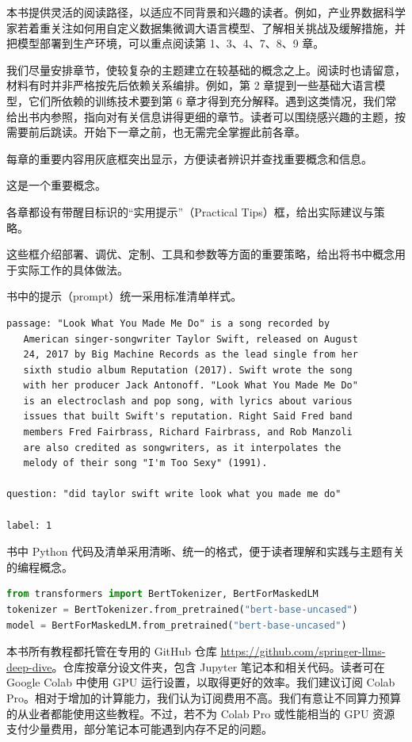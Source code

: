 本书提供灵活的阅读路径，以适应不同背景和兴趣的读者。例如，产业界数据科学家若着重关注如何用自定义数据集微调大语言模型、了解相关挑战及缓解措施，并把模型部署到生产环境，可以重点阅读第 1、3、4、7、8、9 章。

我们尽量安排章节，使较复杂的主题建立在较基础的概念之上。阅读时也请留意，材料有时并非严格按先后依赖关系编排。例如，第 2 章提到一些基础大语言模型，它们所依赖的训练技术要到第 6 章才得到充分解释。遇到这类情况，我们常给出书内参照，指向对有关信息讲得更细的章节。读者可以围绕感兴趣的主题，按需要前后跳读。开始下一章之前，也无需完全掌握此前各章。

每章的重要内容用灰底框突出显示，方便读者辨识并查找重要概念和信息。
\begin{keypoint}
这是一个重要概念。
\end{keypoint}

各章都设有带醒目标识的“实用提示”（Practical Tips）框，给出实际建议与策略。
\begin{practicaltip}
这些框介绍部署、调优、定制、工具和参数等方面的重要策略，给出将书中概念用于实际工作的具体做法。
\end{practicaltip}

书中的提示（prompt）统一采用标准清单样式。
\begin{lstlisting}[caption={GLUE 的 BoolQ 示例}]
passage: "Look What You Made Me Do" is a song recorded by
   American singer-songwriter Taylor Swift, released on August
   24, 2017 by Big Machine Records as the lead single from her
   sixth studio album Reputation (2017). Swift wrote the song
   with her producer Jack Antonoff. "Look What You Made Me Do"
   is an electroclash and pop song, with lyrics about various
   issues that built Swift's reputation. Right Said Fred band
   members Fred Fairbrass, Richard Fairbrass, and Rob Manzoli
   are also credited as songwriters, as it interpolates the
   melody of their song "I'm Too Sexy" (1991).

question: "did taylor swift write look what you made me do"

label: 1
\end{lstlisting}

书中 Python 代码及清单采用清晰、统一的格式，便于读者理解和实践与主题有关的编程概念。
\begin{lstlisting}[language=Python,caption={初始化 BERT 词元切分器和模型的 Python 代码}]
from transformers import BertTokenizer, BertForMaskedLM
tokenizer = BertTokenizer.from_pretrained("bert-base-uncased")
model = BertForMaskedLM.from_pretrained("bert-base-uncased")
\end{lstlisting}

本书所有教程都托管在专用的 GitHub 仓库 \url{https://github.com/springer-llms-deep-dive}。仓库按章分设文件夹，包含 Jupyter 笔记本和相关代码。读者可在 Google Colab 中使用 GPU 运行设置，以取得更好的效率。我们建议订阅 Colab Pro。相对于增加的计算能力，我们认为订阅费用不高。我们有意让不同算力预算的从业者都能使用这些教程。不过，若不为 Colab Pro 或性能相当的 GPU 资源支付少量费用，部分笔记本可能遇到内存不足的问题。
